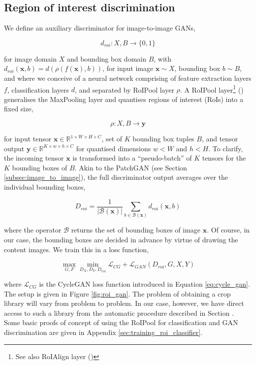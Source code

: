 \subsection{Region of interest discrimination}

We define an auxiliary discriminator for image-to-image GANs,

\begin{equation}
d_{roi} : X, B \to \{0, 1\}
\end{equation}

for image domain $X$ and bounding box domain $B$, with $d_{roi}(\mathbf{x}, b) = d(\rho(f(\mathbf{x}), b))$, for input image $\mathbf{x} \sim X$, bounding box $b \sim B$, and where we conceive of a neural network comprising of feature extraction layers $f$, classification layers $d$, and separated by RoIPool layer $\rho$. A RoIPool layer\footnote{See also RoIAlign layer (\cite{he2017mask})} (\cite{girshick2015fast}) generalises the MaxPooling layer and quantises regions of interest (RoIs) into a fixed size,

\begin{equation}
\rho : X, B \to \mathbf{y}
\end{equation}

for input tensor $\mathbf{x} \in \mathbb{R}^{1\times W \times H \times C}$, set of $K$ bounding box tuples $B$, and tensor output $\mathbf{y} \in \mathbb{R}^{K \times w \times h \times C}$ for quantised dimensions $w < W$ and $h < H$. To clarify, the incoming tensor $\mathbf{x}$ is transformed into a ``pseudo-batch'' of $K$ tensors for the $K$ bounding boxes of $B$. Akin to the PatchGAN (see Section \ref{subsec:image_to_image}), the full discriminator output averages over the individual bounding boxes,

\begin{equation}
D_{roi} = \frac{1}{|\mathcal{B}(\mathbf{x})|}\sum_{b \in \mathcal{B}(\mathbf{x})} d_{roi}(\mathbf{x}, b)
\end{equation}

where the operator $\mathcal{B}$ returns the set of bounding boxes of image $\mathbf{x}$. Of course, in our case, the bounding boxes are decided in advance by virtue of drawing the content images. We train this in a loss function,

\begin{equation}
\max_{G, F}\min_{D_X, D_Y, D_{roi}} \mathcal{L}_{CG} + \mathcal{L}_{GAN}(D_{roi}, G, X, Y)
\end{equation}

where $\mathcal{L}_{CG}$ is the CycleGAN loss function introduced in Equation \ref{eq:cycle_gan}. The setup is given in Figure \ref{fig:roi_gan}. The problem of obtaining a crop library will vary from problem to problem. In our case, however, we have direct access to such a library from the automatic procedure described in Section \label{subsec:data}. Some basic proofs of concept of using the RoIPool for classification and GAN discrimination are given in Appendix \ref{sec:training_roi_classifier}.

